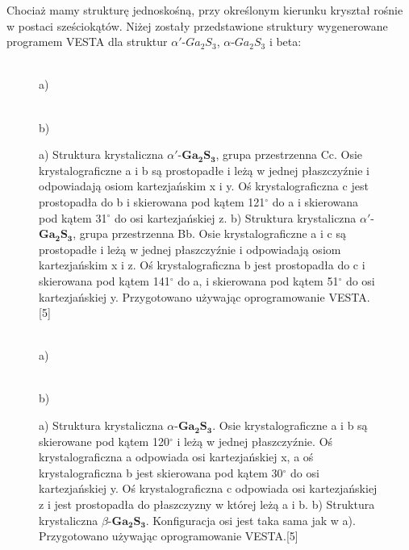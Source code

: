 Chociaż mamy strukturę jednoskośną, przy określonym kierunku kryształ rośnie w postaci sześciokątów. Niżej zostały przedstawione struktury wygenerowane programem VESTA dla struktur $\alpha'$-$Ga_{2}S_{3}$, $\alpha$-$Ga_{2}S_{3}$ i  beta:

\begin{center}
	\begin{figure}[H]
		\begin{minipage}[h]{0.47\linewidth}
			 \\a)
		\end{minipage}
		\hfill
		\begin{minipage}[h]{0.47\linewidth}
			 \\b)
		\end{minipage}
		\caption{a) Struktura krystaliczna $\alpha'$-$\mathbf{Ga_{2}S_{3}}$, grupa przestrzenna Cc. Osie krystalograficzne a i b są prostopadłe i leżą w jednej płaszczyźnie i odpowiadają osiom kartezjańskim x i y. Oś krystalograficzna c jest prostopadła do b i skierowana pod kątem 121$^{\circ}$ do a i skierowana pod kątem 31$^{\circ}$ do osi kartezjańskiej z. b) Struktura krystaliczna $\alpha'$-$\mathbf{Ga_{2}S_{3}}$, grupa przestrzenna Bb. Osie krystalograficzne a i c są prostopadłe i leżą w jednej płaszczyźnie i odpowiadają osiom kartezjańskim x i z. Oś krystalograficzna b jest prostopadła do c i skierowana pod kątem 141$^{\circ}$ do a, i skierowana pod kątem 51$^{\circ}$ do osi kartezjańskiej y. Przygotowano używając oprogramowanie VESTA.[5]}
	\end{figure}
\end{center}

\begin{center}
	\begin{figure}[H]
		\begin{minipage}[h]{0.47\linewidth}
			 \\a)
		\end{minipage}
		\hfill
		\begin{minipage}[h]{0.47\linewidth}
			 \\b)
		\end{minipage}
		\caption{a) Struktura krystaliczna $\alpha$-$\mathbf{Ga_{2}S_{3}}$. Osie krystalograficzne a i b są skierowane pod kątem 120$^{\circ}$ i leżą w jednej płaszczyźnie. Oś krystalograficzna a odpowiada osi kartezjańskiej x, a oś krystalograficzna b jest skierowana pod kątem 30$^{\circ}$ do osi kartezjańskiej y. Oś krystalograficzna c odpowiada osi kartezjańskiej z i jest prostopadła do płaszczyzny w której leżą a i b. b) Struktura krystaliczna $\beta$-$\mathbf{Ga_{2}S_{3}}$. Konfiguracja osi jest taka sama jak w a). Przygotowano używając oprogramowanie VESTA.[5]}
	\end{figure}
\end{center}


